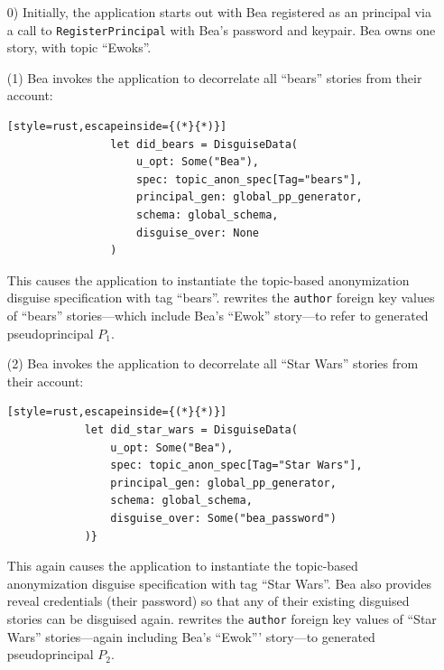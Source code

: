 \begin{enumerate}[nosep]
    \item[0)] Initially, the application starts out with Bea registered as an
        \sys principal via a call to \texttt{RegisterPrincipal} with Bea's
        password and keypair. Bea owns one story, with topic ``Ewoks''.

    \item[(1)] Bea invokes the application to decorrelate all ``bears'' stories 
        from their account: 

            \vspace{12pt}
            \begin{lstlisting}[style=rust,escapeinside={(*}{*)}]
                let did_bears = DisguiseData(
                    u_opt: Some("Bea"), 
                    spec: topic_anon_spec[Tag="bears"],
                    principal_gen: global_pp_generator,
                    schema: global_schema,
                    disguise_over: None
                )
            \end{lstlisting}

        This causes the application to instantiate the
        topic-based anonymization disguise specification with tag ``bears''.
        \sys rewrites the \texttt{author} foreign key values of ``bears''
         stories---which include Bea's ``Ewok'' story---to refer to generated
        pseudoprincipal $P_1$.

        \item[(2)] Bea invokes the application to decorrelate all ``Star Wars''
            stories from
        their account: 

        \vspace{12pt}
        \begin{lstlisting}[style=rust,escapeinside={(*}{*)}]
            let did_star_wars = DisguiseData(
                u_opt: Some("Bea"), 
                spec: topic_anon_spec[Tag="Star Wars"],
                principal_gen: global_pp_generator,
                schema: global_schema,
                disguise_over: Some("bea_password")
            )}
        \end{lstlisting}

        This again causes the application to instantiate the topic-based
        anonymization disguise specification with tag ``Star Wars''. Bea also
        provides reveal credentials (\eg their password) so that any of their existing
        disguised stories can be disguised again. \sys rewrites the
        \texttt{author} foreign key values of ``Star Wars'' stories---again
        including Bea's ``Ewok''' story---to generated pseudoprincipal $P_2$.
    

\end{enumerate}
